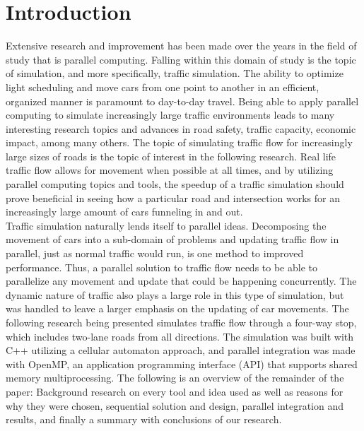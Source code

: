 \documentclass[conference]{IEEEtran}
\begin{document}
\section{Introduction}
Extensive research and improvement has been made over the years in the field of study that is parallel computing. Falling within this domain of study is the topic of simulation, and more specifically, traffic simulation. The ability to optimize light scheduling and move cars from one point to another in an efficient, organized manner is paramount to day-to-day travel. Being able to apply parallel computing to simulate increasingly large traffic environments leads to many interesting research topics and advances in road safety, traffic capacity, economic impact, among many others. The topic of simulating traffic flow for increasingly large sizes of roads is the topic of interest in the following research. Real life traffic flow allows for movement when possible at all times, and by utilizing parallel computing topics and tools, the speedup of a traffic simulation should prove beneficial in seeing how a particular road and intersection works for an increasingly large amount of cars funneling in and out.  \\
Traffic simulation naturally lends itself to parallel ideas. Decomposing the movement of cars into a sub-domain of problems and updating traffic flow in parallel, just as normal traffic would run, is one method to improved performance. Thus, a parallel solution to traffic flow needs to be able to parallelize any movement and update that could be happening concurrently. The dynamic nature of traffic also plays a large role in this type of simulation, but was handled to leave a larger emphasis on the updating of car movements. The following research being presented simulates traffic flow through a four-way stop, which includes two-lane roads from all directions. The simulation was built with C++ utilizing a cellular automaton approach, and parallel integration was made with OpenMP, an application programming interface (API) that supports shared memory multiprocessing. The following is an overview of the remainder of the paper: Background research on every tool and idea used as well as reasons for why they were chosen, sequential solution and design, parallel integration and results, and finally a summary with conclusions of our research.
\end{document}
